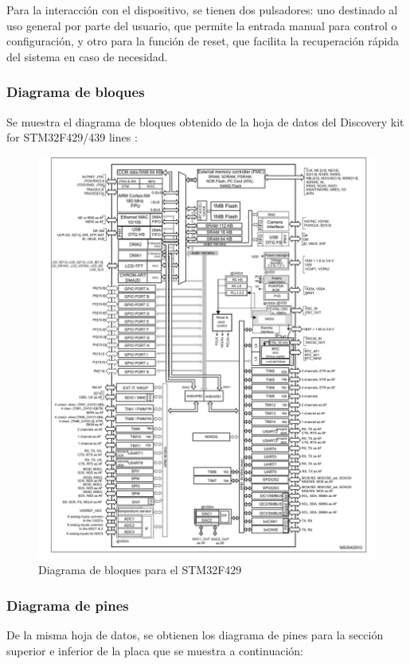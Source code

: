     Para la interacción con el dispositivo, se tienen dos pulsadores: uno destinado al uso general por parte del usuario, que permite la entrada manual para control o configuración, y otro para la función de reset, que facilita la recuperación rápida del sistema en caso de necesidad. 
    
    \subsubsection{Diagrama de bloques}
    Se muestra el diagrama de bloques obtenido de la hoja de datos del Discovery kit for STM32F429/439 lines \cite{STM2}:
    
    \begin{figure}[H]
        \centering
        \includegraphics[width=0.8\linewidth]{fotos/diagrama bloque.jpeg}
        \caption{Diagrama de bloques para el STM32F429 \cite{STM2}}
        \label{diag_bloques}
    \end{figure}
    
    
    \subsubsection{Diagrama de pines}
    De la misma hoja de datos, se obtienen los diagrama de pines para la sección superior e inferior de la placa que se muestra a continuación: 
        
